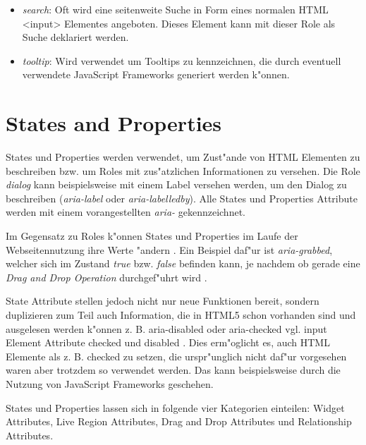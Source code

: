 \documentclass[a4paper,bibtotoc,oneside]{scrbook}
\begin{document}
\begin{itemize}
\item \emph{search}: Oft wird eine seitenweite Suche in Form eines normalen HTML <input> Elementes angeboten. Dieses Element kann mit dieser Role als Suche deklariert werden. \cite[Abschnitt 5.4, search]{aria_roles}

\item \emph{tooltip}: Wird verwendet um Tooltips zu kennzeichnen, die durch eventuell verwendete JavaScript Frameworks generiert werden k"onnen. \cite[Abschnitt 5.4, tooltip]{aria_roles}
\end{itemize}



\section{States and Properties}
States und Properties werden verwendet, um Zust"ande von HTML Elementen zu beschreiben bzw. um Roles mit zus"atzlichen Informationen zu versehen. Die Role \emph{dialog} kann beispielsweise mit einem Label versehen werden, um den Dialog zu beschreiben (\emph{aria-label} oder \emph{aria-labelledby})\cite[Abschnitt 5.4, dialog]{aria_roles}. Alle States und Properties Attribute werden mit einem vorangestellten \emph{aria-} gekennzeichnet. \cite[Abschnitt 6.1]{aria_states}

Im Gegensatz zu Roles k"onnen States und Properties im Laufe der Webseitennutzung ihre Werte "andern \cite[S. 29]{mod_software}. Ein Beispiel daf"ur ist \emph{aria-grabbed}, welcher sich im Zustand \emph{true} bzw. \emph{false} befinden kann, je nachdem ob gerade eine \emph{Drag and Drop Operation} durchgef"uhrt wird \cite[Abschnitt 6.6, aria-grabbed]{aria_states}.

State Attribute stellen jedoch nicht nur neue Funktionen bereit, sondern duplizieren zum Teil auch Information, die in HTML5 schon vorhanden sind und ausgelesen werden k"onnen z. B. aria-disabled oder aria-checked \cite[States and Properties]{aria} vgl. input Element Attribute checked und disabled \cite[Abschnitt Forms, Input Element]{html4}. Dies erm"oglicht es, auch HTML Elemente als z. B. checked zu setzen, die urspr"unglich nicht daf"ur vorgesehen waren aber trotzdem so verwendet werden. Das kann beispielsweise durch die Nutzung von JavaScript Frameworks geschehen. 

States und Properties lassen sich in folgende vier Kategorien einteilen: Widget Attributes, Live Region Attributes, Drag and Drop Attributes und Relationship Attributes. \cite[Abschnitt 6.5]{aria_states}
\end{document}
